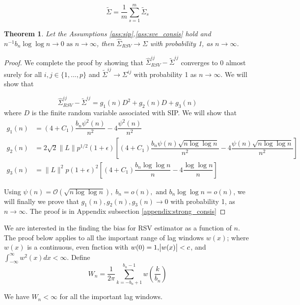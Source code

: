 \documentclass[12pt]{article}
\newtheorem{theorem}{Theorem}
\theoremstyle{remark}
\begin{document}
\[
\tilde{\Sigma} = \dfrac{1}{m}\sum\limits_{s=1}^{m}\tilde{\Sigma}_s
\]


\begin{theorem}
\label{th:consistency}
 Let the Assumptions \ref{ass:sip},\ref{ass:sve_consis} hold and $n^{-1}{b_n \log \log n} \to 0 \textrm{ as } n \to \infty$, then $\hat{\Sigma}_{RSV} \to \Sigma$ with probability 1, as $n \to \infty$.
\end{theorem} 

\begin{proof}
We complete the proof by showing that $\hat{\Sigma}_{RSV}^{ij} - \tilde{\Sigma}^{ij}$ converges to 0 almost surely for all $i,j \in \{1,...,p\}$ and $\tilde{\Sigma}^{ij} \to \Sigma^{ij}$ with probability 1 as $n \to \infty$. We will show that 

\[
\hat{\Sigma}_{RSV}^{ij} - \tilde{\Sigma}^{ij} = g_1(n)D^2 + g_2(n)D + g_3(n)
\]
where $D$ is the finite random variable associated with SIP. We will show that
\begin{align*}
    g_1(n) &= (4+C_1)\dfrac{b_n \psi^2(n)}{n^2} - 4\dfrac{\psi^2(n)}{n^2}\\
    g_2(n) &= 2\sqrt{2}\|L\|p^{1/2}(1+\epsilon)\left[(4+C_1)\dfrac{b_n\psi(n)\sqrt{n\log \log n}}{n^2} - 4\dfrac{\psi(n)\sqrt{n\log \log n}}{n^2}\right]\\
    g_3(n) &= \|L\|^2 p (1+\epsilon)^2\left[(4+C_1)\dfrac{b_n \log\log n}{n} - 4 \dfrac{\log \log n}{n}\right]
\end{align*}

Using $\psi(n) = \mathcal{O}(\sqrt{n \log \log n}),\; b_n = o(n), \textrm{ and } b_n \log \log n = o(n)$, we will finally we prove that $g_1(n), g_2(n), g_3(n) \to 0$ with probability 1, as $n \to \infty$. The proof is in Appendix subsection \ref{appendix:strong_consis}
\end{proof}

We are interested in the finding the bias for RSV estimator as a function of $n$. The proof below applies to all the important range of lag windows $w(x)$; where $w(x)$ is a continuous, even fnction with $w(0)=1, \abs{w(x)} < c$, and $\int_{-\infty}^{\infty}w^2(x)dx < \infty$. Define
%
\[
W_n = \dfrac{1}{2\pi}\sum_{k=-b_n+1}^{b_n-1}w\left(\dfrac{k}{b_n}\right)
\]

We have $W_n < \infty$ for all the important lag windows.
\end{document}
